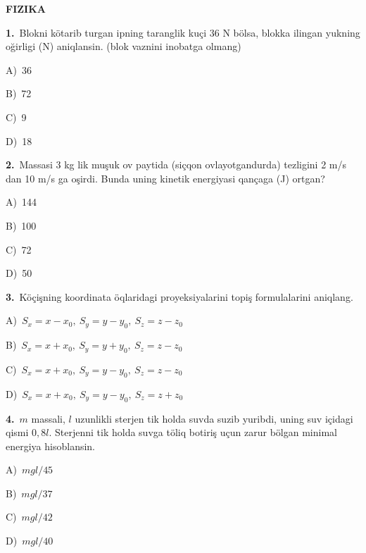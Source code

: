 \documentclass[11pt,a4paper]{article}
\newcommand{\opt}[2]{\hspace*{4mm}#1)\ #2\par}
\begin{document}
\begin{center}{\Large\textbf{FIZIKA}}\end{center}
\noindent\begin{minipage}{\linewidth}
\textbf{1.}\ Blokni kötarib turgan ipning taranglik kuçi 36 N bölsa, blokka ilingan yukning oğirligi (N) aniqlansin. (blok vaznini inobatga olmang)\par\smallskip
\noindent\hspace*{4mm}\par\smallskip
\opt{A}{36}
\opt{B}{72}
\opt{C}{9}
\opt{D}{18}
\end{minipage}\vspace{9pt}\par
\noindent\begin{minipage}{\linewidth}
\textbf{2.}\ Massasi 3 kg lik muşuk ov paytida (siçqon ovlayotgandurda) tezligini 2 m/s dan 10 m/s ga oşirdi. Bunda uning kinetik energiyasi qançaga (J) ortgan?\par\smallskip
\opt{A}{144}
\opt{B}{100}
\opt{C}{72}
\opt{D}{50}
\end{minipage}\vspace{9pt}\par
\noindent\begin{minipage}{\linewidth}
\textbf{3.}\ Köçişning koordinata öqlaridagi proyeksiyalarini topiş formulalarini aniqlang.\par\smallskip
\opt{A}{$S_x=x-x_0,\ S_y=y-y_0,\ S_z=z-z_0$}
\opt{B}{$S_x=x+x_0,\ S_y=y+y_0,\ S_z=z-z_0$}
\opt{C}{$S_x=x+x_0,\ S_y=y-y_0,\ S_z=z-z_0$}
\opt{D}{$S_x=x+x_0,\ S_y=y-y_0,\ S_z=z+z_0$}
\end{minipage}\vspace{9pt}\par
\noindent\begin{minipage}{\linewidth}
\textbf{4.}\ $m$ massali, $l$ uzunlikli sterjen tik holda suvda suzib yuribdi, uning suv içidagi qismi $0{,}8l$. Sterjenni tik holda suvga töliq botiriş uçun zarur bölgan minimal energiya hisoblansin.\par\smallskip
\opt{A}{$mgl/45$}
\opt{B}{$mgl/37$}
\opt{C}{$mgl/42$}
\opt{D}{$mgl/40$}
\end{minipage}\vspace{9pt}\par
\end{document}
